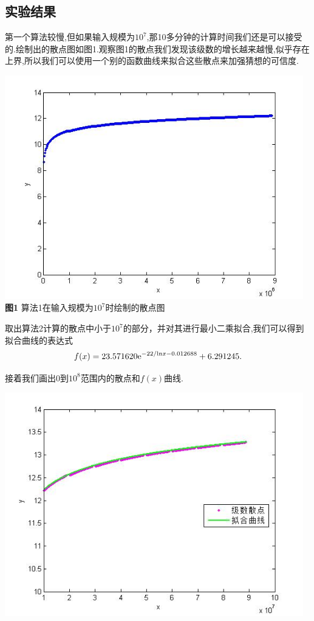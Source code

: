 \documentclass[a4paper,12pt]{article}
\begin{document}
\begin{CJK*}{UTF8}{gbsn}
\subsection{实验结果}
第一个算法较慢,但如果输入规模为$10^7$,那10多分钟的计算时间我们还是可以接受的.绘制出的散点图如图1.观察图1的散点我们发现该级数的增长越来越慢,似乎存在上界,所以我们可以使用一个别的函数曲线来拟合这些散点来加强猜想的可信度.\vspace{-4pt}
\begin{center}
\includegraphics[width = 13cm]{Report02_1.jpg}\\
\textbf{图1} 算法1在输入规模为$10^7$时绘制的散点图\\
\end{center}\par
\vspace{8pt}
取出算法2计算的散点中小于$10^7$的部分，并对其进行最小二乘拟合,我们可以得到拟合曲线的表达式
\begin{equation*}
f(x) = 23.571620{\rm e}^{{-22/{\rm ln}x-0.012688}}+6.291245.
\end{equation*}\par
接着我们画出$0$到$10^8$范围内的散点和$f(x)$曲线.\vspace{-4pt}
\begin{center}
\includegraphics[width = 13cm]{Report02_2.jpg}\\

\end{center}
\end{CJK*}
\end{document}
